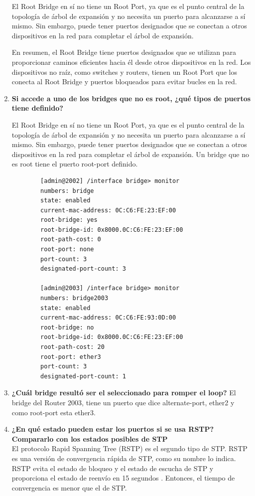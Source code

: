\documentclass[a4paper]{article}
\begin{document}
\begin{enumerate}
	El Root Bridge en sí no tiene un Root Port, ya que es el punto central de la topología de árbol de expansión y no necesita un puerto para alcanzarse a sí mismo. Sin embargo, puede tener puertos designados que se conectan a otros dispositivos en la red para completar el árbol de expansión.
	
	En resumen, el Root Bridge tiene puertos designados que se utilizan para proporcionar caminos eficientes hacia él desde otros dispositivos en la red. Los dispositivos no raíz, como switches y routers, tienen un Root Port que los conecta al Root Bridge y puertos bloqueados para evitar bucles en la red.
	\item \textbf{Si accede a uno de los bridges que no es root, ¿qué tipos
	de puertos tiene definido?}
	
	El Root Bridge en sí no tiene un Root Port, ya que es el punto central de la topología de árbol de expansión y no necesita un puerto para alcanzarse a sí mismo. Sin embargo, puede tener puertos designados que se conectan a otros dispositivos en la red para completar el árbol de expansión.
	Un bridge que no es root tiene el puerto root-port definido.
		
	\begin{lstlisting}
		[admin@2002] /interface bridge> monitor
		numbers: bridge
		state: enabled
		current-mac-address: 0C:C6:FE:23:EF:00
		root-bridge: yes
		root-bridge-id: 0x8000.0C:C6:FE:23:EF:00
		root-path-cost: 0
		root-port: none
		port-count: 3
		designated-port-count: 3
		
		[admin@2003] /interface bridge> monitor
		numbers: bridge2003
		state: enabled
		current-mac-address: 0C:C6:FE:93:0D:00
		root-bridge: no
		root-bridge-id: 0x8000.0C:C6:FE:23:EF:00
		root-path-cost: 20
		root-port: ether3
		port-count: 3
		designated-port-count: 1
	\end{lstlisting}
	\item  \textbf{¿Cuál bridge resultó ser el seleccionado para romper el
loop?
	}
    El bridge del Router 2003, tiene un puerto que dice alternate-port, ether2 y como root-port esta ether3.
    


\item \textbf{¿En qué estado pueden estar los puertos si se usa RSTP?
	Compararlo con los estados posibles de STP
}
\\
El protocolo Rapid Spanning Tree (RSTP) es el segundo tipo de STP. RSTP es una versión de convergencia rápida de STP, como su nombre lo indica. RSTP evita el estado de bloqueo y el estado de escucha de STP y proporciona el estado de reenvío en 15 segundos . Entonces, el tiempo de convergencia es menor que el de STP.


\end{enumerate}
\end{document}
